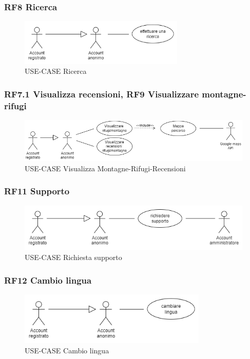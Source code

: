 \documentclass[a4paper,12pt]{article}
\begin{document}
\subsubsection*{RF8 Ricerca}
\begin{figure}[H]
   \centering
   \includegraphics[width=0.7\textwidth]{img-D2/ricerca.png}
    \caption{USE-CASE Ricerca}
\end{figure}

\subsubsection*{RF7.1 Visualizza recensioni, RF9 Visualizzare montagne-rifugi}
\begin{figure}[H]
   \centering
   \includegraphics[width=1.0\textwidth]{img-D2/visualizzare_montagne.png}
    \caption{USE-CASE Visualizza Montagne-Rifugi-Recensioni}
\end{figure}


\subsubsection*{RF11 Supporto}
\begin{figure}[H]
   \centering
   \includegraphics[width=1\textwidth]{img-D2/richiesta_supporto.png}
    \caption{USE-CASE Richiesta supporto}
\end{figure}

\subsubsection*{RF12 Cambio lingua}
\begin{figure}[H]
   \centering
   \includegraphics[width=0.8\textwidth]{img-D2/cambio_lingua.png}
    \caption{USE-CASE Cambio lingua}
\end{figure}
\end{document}
